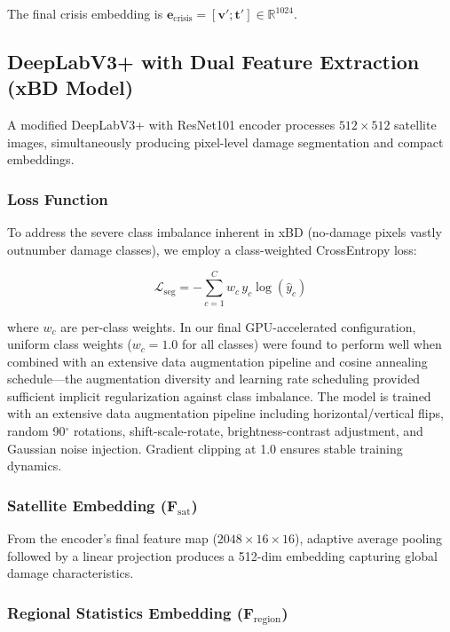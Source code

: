 \documentclass[journal]{IEEEtran}
\begin{document}
The final crisis embedding is $\mathbf{e}_\text{crisis} = [\mathbf{v}'; \mathbf{t}'] \in \mathbb{R}^{1024}$.

\subsection{DeepLabV3+ with Dual Feature Extraction (xBD Model)}

A modified DeepLabV3+ with ResNet101 encoder processes $512 \times 512$ satellite images, simultaneously producing pixel-level damage segmentation and compact embeddings.

\subsubsection{Loss Function}

To address the severe class imbalance inherent in xBD (no-damage pixels vastly outnumber damage classes), we employ a class-weighted CrossEntropy loss:

\begin{equation}
\mathcal{L}_\text{seg} = -\sum_{c=1}^{C} w_c \, y_c \log(\hat{y}_c)
\end{equation}

where $w_c$ are per-class weights. In our final GPU-accelerated configuration, uniform class weights ($w_c = 1.0$ for all classes) were found to perform well when combined with an extensive data augmentation pipeline and cosine annealing schedule—the augmentation diversity and learning rate scheduling provided sufficient implicit regularization against class imbalance. The model is trained with an extensive data augmentation pipeline including horizontal/vertical flips, random 90$^\circ$ rotations, shift-scale-rotate, brightness-contrast adjustment, and Gaussian noise injection. Gradient clipping at 1.0 ensures stable training dynamics.

\subsubsection{Satellite Embedding ($\mathbf{F}_\text{sat}$)}

From the encoder's final feature map ($2048 \times 16 \times 16$), adaptive average pooling followed by a linear projection produces a 512-dim embedding capturing global damage characteristics.

\subsubsection{Regional Statistics Embedding ($\mathbf{F}_\text{region}$)}
\end{document}
